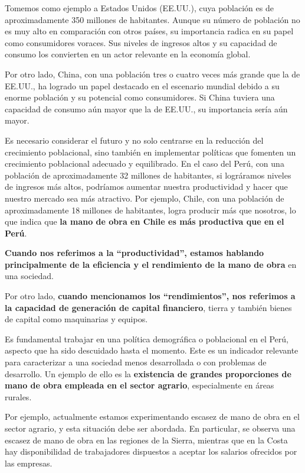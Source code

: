\documentclass[
  jou,
  floatsintext,
  longtable,
  a4paper,
  nolmodern,
  notxfonts,
  notimes,
  12pt,
  colorlinks=true,linkcolor=blue,citecolor=blue,urlcolor=blue]{apa7}
\begin{document}
Tomemos como ejemplo a Estados Unidos (EE.UU.), cuya población es de
aproximadamente 350 millones de habitantes. Aunque su número de
población no es muy alto en comparación con otros países, su importancia
radica en su papel como consumidores voraces. Sus niveles de ingresos
altos y su capacidad de consumo los convierten en un actor relevante en
la economía global.

Por otro lado, China, con una población tres o cuatro veces más grande
que la de EE.UU., ha logrado un papel destacado en el escenario mundial
debido a su enorme población y su potencial como consumidores. Si China
tuviera una capacidad de consumo aún mayor que la de EE.UU., su
importancia sería aún mayor.

Es necesario considerar el futuro y no solo centrarse en la reducción
del crecimiento poblacional, sino también en implementar políticas que
fomenten un crecimiento poblacional adecuado y equilibrado. En el caso
del Perú, con una población de aproximadamente 32 millones de
habitantes, si lográramos niveles de ingresos más altos, podríamos
aumentar nuestra productividad y hacer que nuestro mercado sea más
atractivo. Por ejemplo, Chile, con una población de aproximadamente 18
millones de habitantes, logra producir más que nosotros, lo que indica
que \textbf{la mano de obra en Chile es más productiva que en el Perú}.

\textbf{Cuando nos referimos a la ``productividad'', estamos hablando
principalmente de la eficiencia y el rendimiento de la mano de obra} en
una sociedad.

Por otro lado, \textbf{cuando mencionamos los ``rendimientos'', nos
referimos a la capacidad de generación de capital financiero}, tierra y
también bienes de capital como maquinarias y equipos.

Es fundamental trabajar en una política demográfica o poblacional en el
Perú, aspecto que ha sido descuidado hasta el momento. Este es un
indicador relevante para caracterizar a una sociedad menos desarrollada
o con problemas de desarrollo. Un ejemplo de ello es la
\textbf{existencia de grandes proporciones de mano de obra empleada en
el sector agrario}, especialmente en áreas rurales.

Por ejemplo, actualmente estamos experimentando escasez de mano de obra
en el sector agrario, y esta situación debe ser abordada. En particular,
se observa una escasez de mano de obra en las regiones de la Sierra,
mientras que en la Costa hay disponibilidad de trabajadores dispuestos a
aceptar los salarios ofrecidos por las empresas.
\end{document}
